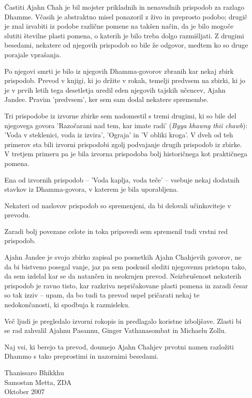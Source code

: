 
Častiti Ajahn Chah je bil mojster prikladnih in nenavadnih prispodob za razlago Dhamme. Včasih je abstraktno misel ponazoril z živo in preprosto podobo; drugič je znal izvabiti iz podobe različne pomene na takšen način, da je bilo mogoče slutiti številne plasti pomena, o katerih je bilo treba dolgo razmišljati. Z drugimi besedami, nekatere od njegovih prispodob so bile že odgovor, medtem ko so druge porajale vprašanja.

Po njegovi smrti je bilo iz njegovih Dhamma-govorov zbranih kar nekaj zbirk prispodob. Prevod v knjigi, ki jo držite v rokah, temelji predvsem na zbirki, ki jo je v prvih letih tega desetletja uredil eden njegovih tajskih učencev, Ajahn Jandee. Pravim 'predvsem', ker sem sam dodal nekatere spremembe.

Tri prispodobe iz izvorne zbirke sem nadomestil s tremi drugimi, ki so bile del njegovega govora 'Razočarani nad tem, kar imate radi' (\emph{Byya khawng thii chawb}): 'Voda v steklenici, voda iz izvira', 'Ograja' in 'V obliki kroga'.  V dveh od teh primerov sta bili izvorni prispodobi zgolj podvajanje drugih prispodob iz zbirke. V tretjem primeru pa je bila izvorna prispodoba bolj historičnega kot praktičnega pomena.

Ena od izvornih prispodob – 'Voda kaplja, voda teče' – vsebuje nekaj dodatnih stavkov iz Dhamma-govora, v katerem je bila uporabljena.

Nekateri od naslovov prispodob so spremenjeni, da bi delovali učinkoviteje v prevodu.

Zaradi bolj povezane celote in toka pripovedi sem spremenil tudi vrstni red prispodob.

Ajahn Jandee je svojo zbirko zapisal po posnetkih Ajahn Chahjevih govorov, ne da bi bistveno posegal vanje, jaz pa sem poskusil slediti njegovemu pristopu tako, da sem izdelal kar se da natančen in neokrnjen prevod. Neizbrušenost nekaterih prispodob je ravno tisto, kar razkriva nepričakovane plasti pomena in zaradi česar so tak izziv – upam, da bo tudi ta prevod uspel pričarati nekaj te nedokončanosti, ki spodbuja k razmisleku.

Več ljudi je pregledalo izvorni rokopis in predlagalo koristne izboljšave. Zlasti bi se rad zahvalil Ajahnu Pasannu, Ginger Vathanasombat in Michaelu Zollu.

Naj vsi, ki berejo ta prevod, doumejo Ajahn Chahjev prvotni namen razložiti Dhammo s tako preprostimi in nazornimi besedami.

\bigskip
{\par\raggedleft
Thanissaro Bhikkhu\\
Samostan Metta, ZDA\\
Oktober 2007
\par}
